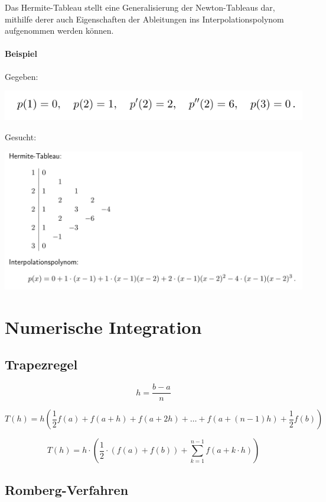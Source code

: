 \documentclass[a4paper, twoside]{article}
\begin{document}
Das Hermite-Tableau stellt eine Generalisierung der Newton-Tableaus dar, mithilfe derer auch Eigenschaften der Ableitungen ins Interpolationspolynom aufgenommen werden können.

\paragraph{Beispiel}

Gegeben:

{\centering\includegraphics[width=.5\textwidth]{hermite_geg}\par}

Gesucht:

{\centering\includegraphics[width=.9\textwidth]{hermite_ges}\par}

\section{Numerische Integration}

\subsection{Trapezregel}

\[h = \frac{b-a}{n}\]

\[T(h) = h\left(\frac{1}{2}f(a) + f(a+h) + f(a+2h) + \ldots + f(a + (n-1)h) + \frac{1}{2}f(b)\right)\]

\[T(h) = h \cdot \left( \frac{1}{2} \cdot (f(a) + f(b)) + \sum_{k=1}^{n-1} f(a + k \cdot h)\right)\]


\subsection{Romberg-Verfahren}
\end{document}
